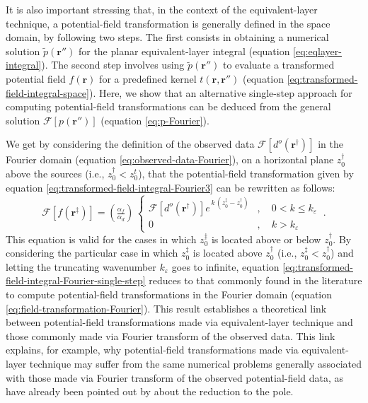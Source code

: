 It is also important stressing that, in the context of the equivalent-layer technique, 
a potential-field transformation is generally defined
in the space domain, by following two steps. The first consists in obtaining a numerical solution $\tilde{p}(\mathbf{r}'')$ for the 
planar equivalent-layer integral (equation \ref{eq:eqlayer-integral}).
The second step involves using $\tilde{p}(\mathbf{r}'')$ to evaluate a transformed potential field
$f(\mathbf{r})$ for a predefined kernel $t(\mathbf{r}, \mathbf{r}'')$ (equation \ref{eq:transformed-field-integral-space}).
Here, we show that an alternative single-step approach for computing potential-field transformations can be 
deduced from the general solution $\mathcal{F} [ p(\mathbf{r}'') ]$ (equation \ref{eq:p-Fourier}).

We get by considering the definition of the observed data $\mathcal{F} \left[ d^{o}(\mathbf{r}^{\dagger}) \right]$ 
in the Fourier domain (equation \ref{eq:observed-data-Fourier}), on a horizontal plane $z^{\dagger}_{0}$ above the sources 
(i.e., $z^{\dagger}_{0} < z^{t}_{0}$), that the potential-field transformation 
given by equation \ref{eq:transformed-field-integral-Fourier3} can be rewritten as follows:
\begin{equation}
	\mathcal{F} [ f(\mathbf{r}^{\ddagger}) ] =
	\left( \tfrac{\alpha_{f}}{\alpha_{d}} \right) \, 
	\begin{cases}
		\mathcal{F} \left[ d^{o}(\mathbf{r}^{\dagger}) \right] 
		e^{\, k \, (z^{\ddagger}_{0} - z^{\dagger}_{0})} & , \quad 0 < k \le k_{\varepsilon} \\
		0 & , \quad k > k_{\varepsilon} 
	\end{cases} \: .
	\label{eq:transformed-field-integral-Fourier-single-step}
\end{equation}
This equation is valid for the cases in which $z^{\ddagger}_{0}$ is located above or below $z^{\dagger}_{0}$.
By considering the particular case in which $z^{\ddagger}_{0}$ is located above $z^{\dagger}_{0}$ 
(i.e., $z^{\ddagger}_{0} < z^{\dagger}_{0}$) and letting the truncating wavenumber $k_{\varepsilon}$ goes to infinite,
equation \ref{eq:transformed-field-integral-Fourier-single-step} reduces to that 
commonly found in the literature \cite[e.g.,][]{gunn1975} to compute 
potential-field transformations in the Fourier domain (equation \ref{eq:field-transformation-Fourier}).
This result establishes a theoretical link between potential-field transformations made via
equivalent-layer technique and those commonly made via Fourier transform of the observed data.
This link explains, for example, why potential-field transformations made via equivalent-layer technique may suffer from the same 
numerical problems generally associated with those made via Fourier transform of the observed potential-field data, 
as have already been pointed out by \citet{li_etal2014} about the reduction to the pole.

